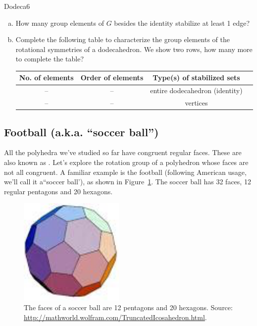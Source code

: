 \begin{exercise}{Dodeca6} 
\begin{enumerate}[(a)]
\item How many group elements of $G$ besides the identity stabilize at least 1 edge?
\item
Complete the following table to characterize the group elements of the rotational symmetries of a dodecahedron.  We show two rows, how many more to complete the table?  

\begin{tabular}{| c |c|c| r |} \hline
 \textbf{No. of elements} & \textbf{Order of elements} & \textbf{Type(s) of stabilized sets} \\ \hline
  --&  --& entire  dodecahedron (identity) \\ \hline
  -- & --&  vertices \\ 
\end{tabular}
\end{enumerate}
\end{exercise}

\subsection{Football (a.k.a. ``soccer ball'')}
All the polyhedra we've studied so far have congruent regular faces.  These are also known as .  Let's explore the rotation group of a polyhedron whose faces are not all congruent.  A familiar example is the football (following 
American usage, we'll call it a``soccer ball'), as shown in  Figure~\ref{fig:Soccer}.  The soccer ball has 32 faces, 12 regular pentagons and 20 hexagons.  

\begin{figure}[ht]
\begin{center}
\includegraphics[width=2in]{images/Soccerball.png}
\caption{The faces of a soccer ball are 12 pentagons and 20 hexagons.  Source: \url{http://mathworld.wolfram.com/TruncatedIcosahedron.html}.
}
\label{fig:Soccer}
\end{center}
\end{figure}



